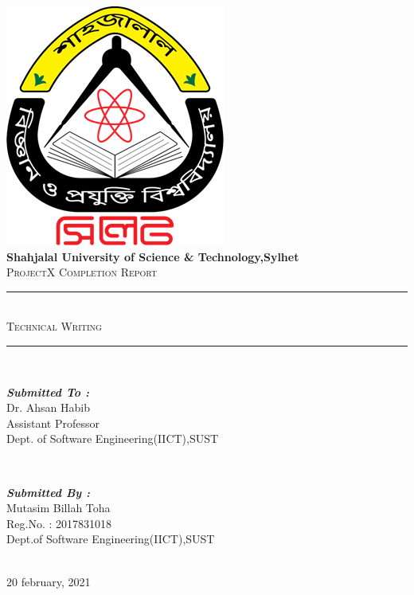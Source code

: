 \documentclass[13pt]{extarticle}
\begin{document}

\begin{titlepage}
	\centering
    \vspace*{0.5 cm}
    \includegraphics[scale = 0.75]{sustlogo.png}\\[1.0 cm]	%
    \textbf{\Large Shahjalal University of Science \& Technology,Sylhet}\\[2.0 cm]	%
	\textsc{\Large ProjectX Completion Report}\\[0.5 cm]				%
	\rule{\linewidth}{0.2 mm} \\[0.4 cm]
    \textsc{\Large Technical Writing}\\
	\rule{\linewidth}{0.2 mm} \\[1.5 cm]
	
	\begin{minipage}{0.5\textwidth}
		\begin{flushleft} \large
			\textbf{\textit{ Submitted To :}}\\
		     Dr. Ahsan Habib\\
		     Assistant Professor\\
            Dept. of Software Engineering(IICT),SUST\\
			\end{flushleft}
			\end{minipage}~
			\begin{minipage}{0.4\textwidth}
            
			\begin{flushright} \large
			\textbf{\textit{Submitted By :}} \\
			Mutasim Billah Toha\\
            Reg.No. : 2017831018\\
            Dept.of Software Engineering(IICT),SUST
		\end{flushright}
	\end{minipage}\\[1.3 cm]
    20 february, 2021\\
\end{titlepage}
\end{document}
